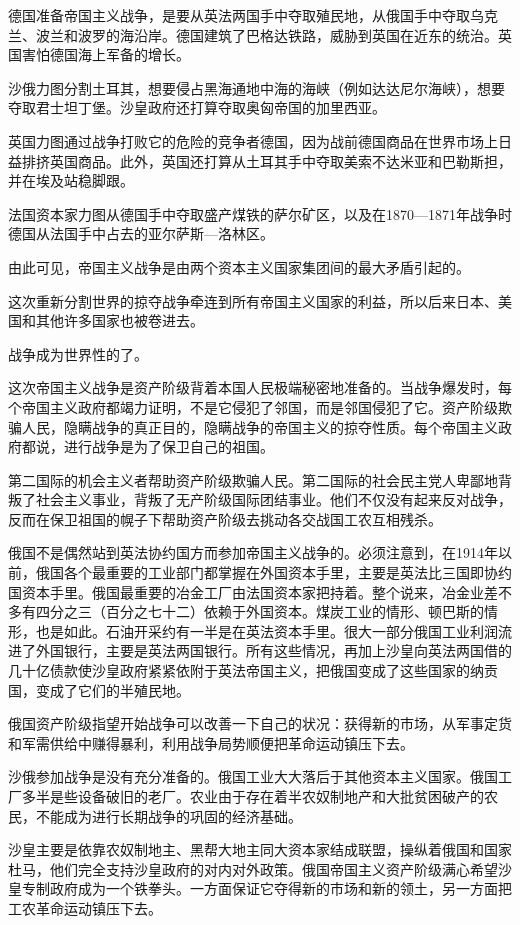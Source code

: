 德国准备帝国主义战争，是要从英法两国手中夺取殖民地，从俄国手中夺取乌克兰、波兰和波罗的海沿岸。德国建筑了巴格达铁路，威胁到英国在近东的统治。英国害怕德国海上军备的增长。

沙俄力图分割土耳其，想要侵占黑海通地中海的海峡（例如达达尼尔海峡），想要夺取君士坦丁堡。沙皇政府还打算夺取奥匈帝国的加里西亚。

英国力图通过战争打败它的危险的竞争者德国，因为战前德国商品在世界市场上日益排挤英国商品。此外，英国还打算从土耳其手中夺取美索不达米亚和巴勒斯担，并在埃及站稳脚跟。

法国资本家力图从德国手中夺取盛产煤铁的萨尔矿区，以及在1870—1871年战争时德国从法国手中占去的亚尔萨斯—洛林区。

由此可见，帝国主义战争是由两个资本主义国家集团间的最大矛盾引起的。

这次重新分割世界的掠夺战争牵连到所有帝国主义国家的利益，所以后来日本、美国和其他许多国家也被卷进去。

战争成为世界性的了。

这次帝国主义战争是资产阶级背着本国人民极端秘密地准备的。当战争爆发时，每个帝国主义政府都竭力证明，不是它侵犯了邻国，而是邻国侵犯了它。资产阶级欺骗人民，隐瞒战争的真正目的，隐瞒战争的帝国主义的掠夺性质。每个帝国主义政府都说，进行战争是为了保卫自己的祖国。

第二国际的机会主义者帮助资产阶级欺骗人民。第二国际的社会民主党人卑鄙地背叛了社会主义事业，背叛了无产阶级国际团结事业。他们不仅没有起来反对战争，反而在保卫祖国的幌子下帮助资产阶级去挑动各交战国工农互相残杀。

俄国不是偶然站到英法协约国方而参加帝国主义战争的。必须注意到，在1914年以前，俄国各个最重要的工业部门都掌握在外国资本手里，主要是英法比三国即协约国资本手里。俄国最重要的冶金工厂由法国资本家把持着。整个说来，冶金业差不多有四分之三（百分之七十二）依赖于外国资本。煤炭工业的情形、顿巴斯的情形，也是如此。石油开采约有一半是在英法资本手里。很大一部分俄国工业利润流进了外国银行，主要是英法两国银行。所有这些情况，再加上沙皇向英法两国借的几十亿债款使沙皇政府紧紧依附于英法帝国主义，把俄国变成了这些国家的纳贡国，变成了它们的半殖民地。

俄国资产阶级指望开始战争可以改善一下自己的状况：获得新的市场，从军事定货和军需供给中赚得暴利，利用战争局势顺便把革命运动镇压下去。

沙俄参加战争是没有充分准备的。俄国工业大大落后于其他资本主义国家。俄国工厂多半是些设备破旧的老厂。农业由于存在着半农奴制地产和大批贫困破产的农民，不能成为进行长期战争的巩固的经济基础。

沙皇主要是依靠农奴制地主、黑帮大地主同大资本家结成联盟，操纵着俄国和国家杜马，他们完全支持沙皇政府的对内对外政策。俄国帝国主义资产阶级满心希望沙皇专制政府成为一个铁拳头。一方面保证它夺得新的市场和新的领土，另一方面把工农革命运动镇压下去。

